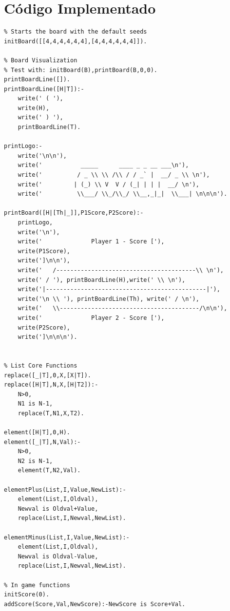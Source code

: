 \documentclass[15pt,a4paper]{article}
\begin{document}
\section{Código Implementado}
 \begin{verbatim}
% Starts the board with the default seeds
initBoard([[4,4,4,4,4,4],[4,4,4,4,4,4]]).

% Board Visualization
% Test with: initBoard(B),printBoard(B,0,0).
printBoardLine([]).
printBoardLine([H|T]):-
	write(' ( '),
	write(H),
	write(' ) '),
	printBoardLine(T).

printLogo:-
	write('\n\n'),
	write('           _____      ____ _ _ __ ___\n'), 
	write('          / _ \\ \\ /\\ / / _` |  __/ _ \\ \n'),
	write('         | (_) \\ V  V / (_| | | |  __/ \n'),
	write('          \\___/ \\_/\\_/ \\__,_|_|  \\___| \n\n\n').
	
printBoard([H|[Th|_]],P1Score,P2Score):-
	printLogo,
	write('\n'),
	write('              Player 1 - Score ['),
	write(P1Score),
	write(']\n\n'),
	write('   /----------------------------------------\\ \n'),
	write(' / '), printBoardLine(H),write(' \\ \n'),
	write('|----------------------------------------------|'),
	write('\n \\ '), printBoardLine(Th), write(' / \n'),
	write('   \\----------------------------------------/\n\n'),
	write('              Player 2 - Score ['),
	write(P2Score),
	write(']\n\n\n').
	

% List Core Functions
replace([_|T],0,X,[X|T]).
replace([H|T],N,X,[H|T2]):- 
	N>0, 
	N1 is N-1,
	replace(T,N1,X,T2).

element([H|T],0,H).
element([_|T],N,Val):-
	N>0,
	N2 is N-1,
	element(T,N2,Val).

elementPlus(List,I,Value,NewList):-
	element(List,I,Oldval),
	Newval is Oldval+Value,
	replace(List,I,Newval,NewList).
	
elementMinus(List,I,Value,NewList):-
	element(List,I,Oldval),
	Newval is Oldval-Value,
	replace(List,I,Newval,NewList).

% In game functions
initScore(0).
addScore(Score,Val,NewScore):-NewScore is Score+Val.


\end{verbatim}
\end{document}
